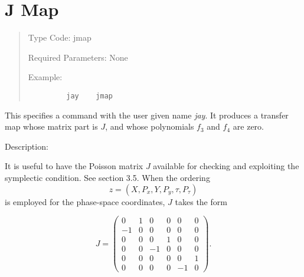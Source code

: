 \newpage
\section{J Map}
\begin{quotation}
\noindent Type Code:  jmap
\vspace{5mm}

\noindent Required Parameters:  None
\vspace{5mm}

\noindent     Example:
\begin{verbatim}
         jay    jmap
\end{verbatim}
\end{quotation}
This specifies a command with the user given name {\em jay}.  It produces a
transfer map whose matrix part is $J$, and whose polynomials $f_3$  and $f_4$  are
zero.

\vspace{5mm}
     Description:
\vspace{2mm}

    It is useful to have the Poisson matrix $J$ available for checking and
exploiting the symplectic condition.   See section 3.5.  When the ordering
\begin{equation}
z = (X , P_x , Y ,  P_y , \tau , P_\tau)
\end{equation}
is employed for the phase-space coordinates, $J$ takes the form

\begin{equation}
J=\left(
\begin{array}{rrrrrr}
 0 & 1 & 0 & 0 & 0 & 0 \\
-1 & 0 & 0 & 0 & 0 & 0 \\
 0 & 0 & 0 & 1 & 0 & 0 \\
 0 & 0 & -1 & 0 & 0 & 0 \\
 0 & 0 & 0 & 0 & 0 & 1 \\
 0 & 0 & 0 & 0 & -1 & 0
 \end{array}
 \right).
\end{equation}

\newpage
